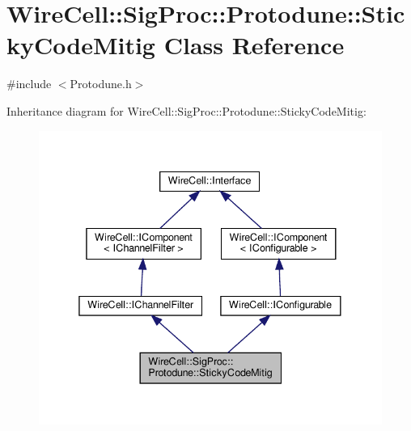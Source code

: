 \hypertarget{class_wire_cell_1_1_sig_proc_1_1_protodune_1_1_sticky_code_mitig}{}\section{Wire\+Cell\+:\+:Sig\+Proc\+:\+:Protodune\+:\+:Sticky\+Code\+Mitig Class Reference}
\label{class_wire_cell_1_1_sig_proc_1_1_protodune_1_1_sticky_code_mitig}


{\ttfamily \#include $<$Protodune.\+h$>$}



Inheritance diagram for Wire\+Cell\+:\+:Sig\+Proc\+:\+:Protodune\+:\+:Sticky\+Code\+Mitig\+:
\nopagebreak
\begin{figure}[H]
\begin{center}
\leavevmode
\includegraphics[width=338pt]{class_wire_cell_1_1_sig_proc_1_1_protodune_1_1_sticky_code_mitig__inherit__graph}
\end{center}
\end{figure}


